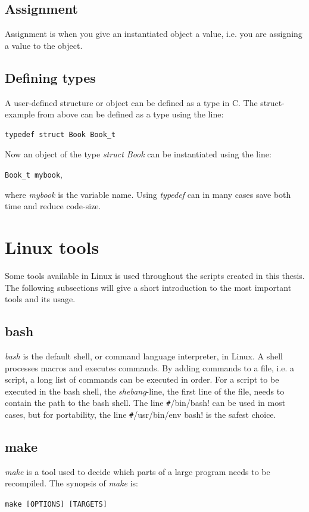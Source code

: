 \subsection{Assignment}
Assignment is when you give an instantiated object a value, i.e. you are assigning a value to the object.
\subsection{Defining types}
A user-defined structure or object can be defined as a type in C. The struct-example from above can be defined as a type using the line:
\begin{lstlisting}
typedef struct Book Book_t
\end{lstlisting}
Now an object of the type \textit{struct Book} can be instantiated using the line:

\verb!Book_t mybook!,

where \textit{mybook} is the variable name. Using \textit{typedef} can in many cases save both time and reduce code-size.

\section{Linux tools}
Some tools available in Linux is used throughout the scripts created in this thesis. The following subsections will give a short introduction to the most important tools and its usage.
\subsection{bash}
\textit{bash} is the default shell, or command language interpreter, in Linux. A shell processes macros and executes commands. By adding commands to a file, i.e. a script, a long list of commands can be executed in order. For a script to be executed in the bash shell, the \textit{shebang}-line, the first line of the file, needs to contain the path to the bash shell. The line \verb!#!/bin/bash! can be used in most cases, but for portability, the line \verb!#!/usr/bin/env bash! is the safest choice.

\subsection{make}
\textit{make} is a tool used to decide which parts of a large program needs to be recompiled. The synopsis of \textit{make} is:

\verb!make [OPTIONS] [TARGETS]!

